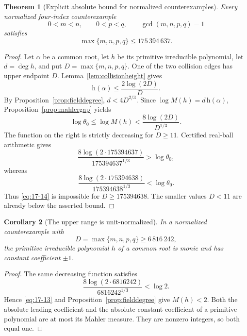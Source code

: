 \documentclass[11pt]{article}
\numberwithin{equation}{section}
\newtheorem{theorem}{Theorem}[section]
\newtheorem{corollary}[theorem]{Corollary}
\theoremstyle{definition}
\begin{document}
\begin{theorem}[Explicit absolute bound for normalized counterexamples]
\label{thm:explicitbound}
Every normalized four-index counterexample
\[
 0<m<n,\qquad0<p<q,\qquad\gcd(m,n,p,q)=1
\]
satisfies
\begin{equation}
 \boxed{\max\{m,n,p,q\}\leq175\,394\,637.}
 \label{eq:17-12}
\end{equation}
\end{theorem}

\begin{proof}
Let \(\alpha\) be a common root, let \(h\) be its primitive irreducible
polynomial, let \(d=\deg h\), and put
\(D=\max\{m,n,p,q\}\).  One of the two collision edges has upper endpoint
\(D\).  Lemma~\ref{lem:collisionheight} gives
\begin{equation}
 \mathrm h(\alpha)\leq\frac{2\log(2D)}D.
 \label{eq:17-13}
\end{equation}
By Proposition~\ref{prop:fielddegree},
\(d<4D^{2/3}\).  Since
\(\log M(h)=d\,\mathrm h(\alpha)\),
Proposition~\ref{prop:mahlergap} yields
\begin{equation}
 \log\theta_0
 \leq\log M(h)
 <\frac{8\log(2D)}{D^{1/3}}.
 \label{eq:17-14}
\end{equation}
The function on the right is strictly decreasing for \(D\geq11\).  Certified
real-ball arithmetic gives
\[
 \frac{8\log(2\cdot175394637)}{175394637^{1/3}}
   >\log\theta_0,
\]
whereas
\[
 \frac{8\log(2\cdot175394638)}{175394638^{1/3}}
   <\log\theta_0.
\]
Thus \eqref{eq:17-14} is impossible for \(D\geq175394638\).  The smaller values
\(D<11\) are already below the asserted bound.
\end{proof}

\begin{corollary}[The upper range is unit-normalized]\label{cor:unitrange}
In a normalized counterexample with
\[
 D=\max\{m,n,p,q\}\geq6\,816\,242,
\]
the primitive irreducible polynomial \(h\) of a common root is monic and has
constant coefficient \(\pm1\).
\end{corollary}

\begin{proof}
The same decreasing function satisfies
\[
 \frac{8\log(2\cdot6816242)}{6816242^{1/3}}<\log2.
\]
Hence \eqref{eq:17-13} and Proposition~\ref{prop:fielddegree} give
\(M(h)<2\).  Both the absolute leading coefficient and the absolute constant
coefficient of a primitive polynomial are at most its Mahler measure.  They
are nonzero integers, so both equal one.
\end{proof}
\end{document}
